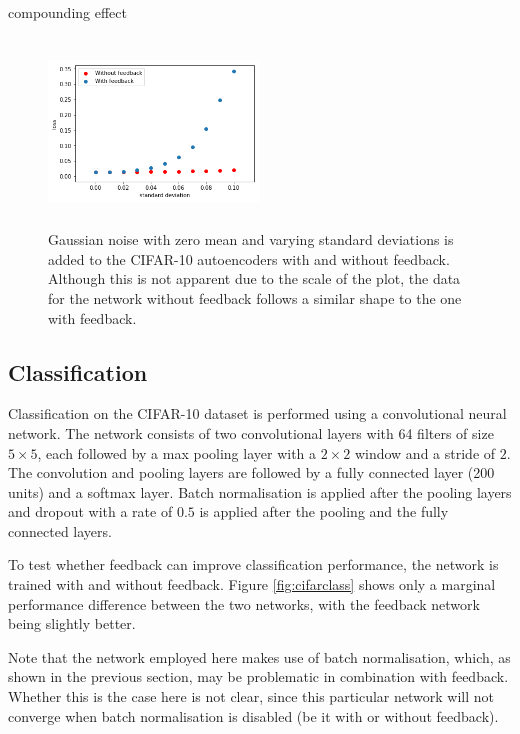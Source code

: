 \documentclass{article}
\begin{document}
compounding effect   

\begin{figure}
      \centering
      \includegraphics[width=0.5\textwidth,height=5cm,keepaspectratio]{img/cifar_actnoise.png}
      \caption{Gaussian noise with zero mean and varying standard deviations is added to the CIFAR-10 autoencoders with and without feedback. Although this is not apparent due to the scale of the plot, the data for the network without feedback follows a similar shape to the one with feedback.}
      \label{fig:cifarnoise}
  \end{figure}

\subsection{Classification} 
Classification on the CIFAR-10 dataset is performed using a convolutional neural network. The network consists of two convolutional layers with 64 filters of size $5 \times 5$, each followed by a max pooling \cite{zhou1988computation} layer with a $2\times2$ window and a stride of $2$. The convolution  and pooling layers are followed by a fully connected layer (200 units) and a softmax \cite{bridle1990probabilistic} layer. 
Batch normalisation is applied after the pooling layers and dropout with a rate of $0.5$ is applied after the pooling and the fully connected layers. 

To test whether feedback can improve classification performance, the network is trained with and without feedback. Figure \ref{fig:cifarclass} shows only a marginal performance difference between the two networks, with the feedback network being slightly better. 

Note that the network employed here makes use of batch normalisation, which, as shown in the previous section, may be problematic in combination with feedback. Whether this is the case here is not clear, since this particular network will not converge when batch normalisation is disabled (be it with or without feedback). 
\end{document}
